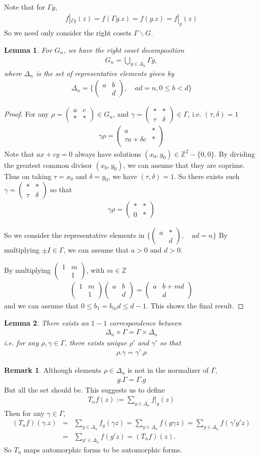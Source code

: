 \documentclass[11pt,reqno]{amsart}
\newcommand{\bna}{\begin{eqnarray*}}
\newcommand{\ena}{\end{eqnarray*}}
\newcommand{\bma}{\begin{pmatrix}}
\newcommand{\ema}{\end{pmatrix}}
\def\Z{\mathbb{Z}}
\newtheorem{lemma}{Lemma}[section]
\theoremstyle{definition}
\newtheorem{remark}{Remark}
\begin{document}
Note that for $\Gamma g$,
\bna
f|_{\Gamma g}(z)=f(\Gamma g.z)=f(g.z)=f|_{g}(z)
\ena
So we need only consider the right cosets $\Gamma\backslash G$.


\begin{lemma}For $G_n$, we have the right coset decomposition
\bna
G_n=\bigcup_{g\in \Delta_n}\Gamma g,
\ena
where $\Delta_n$ is the set of representative elements given by
\bna
\Delta_n=\{\bma a&b\\&d\ema,\quad ad=n,0\leq b<d\}
\ena
\end{lemma}
\begin{proof}
For any $\rho=\bma a&c\\*&*\ema\in G_n$, and
 $\gamma=\bma *&*\\ \tau&\delta\ema\in\Gamma$, i.e. $(\tau,\delta)=1$
\bna
\gamma\rho=\bma a&*\\  \tau a+\delta c &*\\\ema
\ena
Note that  $ax+ cy=0$ always have solutions $(x_0,y_0)\in \Z^2-\{0,0\}$.
By dividing the greatest common divisor
$(x_0,y_0)$, we can assume that they are coprime.
Thus on taking $\tau=x_0$ and $\delta=y_0$, we have $(\tau,\delta)=1$.
So there exists such $\gamma=\bma *&*\\ \tau&\delta\ema$
so that
\bna
\gamma\rho=\bma *&*\\ 0&*\ema
\ena


So we consider the representative elements in $\{\bma a&*\\&d \ema,\quad ad=n\}$
By multiplying $\pm I\in\Gamma$, we can assume that $a>0$ and $d>0$.

By multiplying $\bma 1&m\\&1\ema$, with $m\in \Z$
\bna
\bma 1&m\\&1\ema \bma a&b\\&d\ema=\bma a&b+md\\&d\ema
\ena
and we can assume that $0\leq b_1=b_md\leq d-1$. This shows the final result.

\end{proof}

\begin{lemma}
There exists an $1-1$ correspondence between
\bna
\Delta_n\times\Gamma=\Gamma\times\Delta_n
\ena
i.e. for any $\rho,\gamma\in\Gamma$,
there exists unique $\rho'$ and $\gamma'$ so that
\bna
\rho.\gamma=\gamma'.\rho
\ena

\end{lemma}
\begin{remark}
Although elements  $\rho\in \Delta_n$ is not in the normalizer of $\Gamma$,
\bna
g.\Gamma=\Gamma.g
\ena
But all the set should be. This suggests us to define
\bna
T_n f(z):=\sum_{g\in\Delta_n} f|_{g}(z)
\ena
Then for any $\gamma\in \Gamma$,
\bna
(T_nf)(\gamma.z)&=&\sum_{g\in\Delta_n} f_g(\gamma z)
=\sum_{g\in\Delta_n} f(g\gamma z)=\sum_{g\in\Delta_n} f(\gamma'g' z)\\
&=&\sum_{g'\in\Delta_n} f(g' z)=(T_nf)(z).
\ena
So $T_n$ maps automorphic forms to be automorphic forms.


\end{remark}
\end{document}

